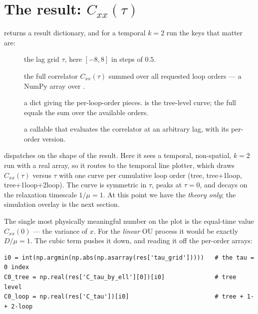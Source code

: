\section{The result: $C_{xx}(\tau)$}

 returns a result dictionary, and for a temporal $k=2$ run the keys
that matter are:

\begin{description}
  \item[] the lag grid $\tau$, here $[-8, 8]$ in steps of
        $0.5$.
  \item[] the full correlator $C_{xx}(\tau)$ summed over all
        requested loop orders --- a NumPy array over .
  \item[] a dict  giving the
        per-loop-order pieces.  is the tree-level curve;
        the full  equals the sum over the available orders.
  \item[] a callable  that
        evaluates the correlator at an arbitrary lag, with
         its per-order version.
\end{description}

 dispatches on the shape of the result.
Here it sees a temporal, non-spatial, $k=2$ run with a real 
array, so it routes to the temporal line plotter, which draws
$C_{xx}(\tau)$ versus $\tau$ with one curve per cumulative loop order (tree,
tree+1loop, tree+1loop+2loop). The curve is symmetric in $\tau$, peaks at
$\tau = 0$, and decays on the relaxation timescale $1/\mu = 1$. At this point we
have the \emph{theory only}; the simulation overlay is the next section.

The single most physically meaningful number on the plot is the equal-time value
$C_{xx}(0)$ --- the variance of $x$. For the \emph{linear} OU process it would be
exactly $D/\mu = 1$. The cubic term pushes it down, and reading it off the
per-order arrays:

\begin{lstlisting}
i0 = int(np.argmin(np.abs(np.asarray(res['tau_grid']))))   # the tau = 0 index
C0_tree = np.real(res['C_tau_by_ell'][0])[i0]              # tree level
C0_loop = np.real(res['C_tau'])[i0]                        # tree + 1- + 2-loop
\end{lstlisting}

